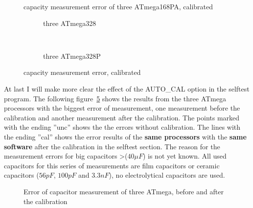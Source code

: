 \begin{figure}[H]
\centering

\caption{capacity measurement error of three ATmega168PA, calibrated}
\label{fig:mega168PAcal}
\end{figure}

\begin{figure}[H]
  \begin{subfigure}[b]{9cm}
    \centering
    \resizebox{9cm}{!}{}
    \caption{three ATmega328}
    \label{fig:mega328cal}
  \end{subfigure}
  ~
  \begin{subfigure}[b]{9cm}
    \centering
    \resizebox{9cm}{!}{}
    \caption{three ATmega328P}
    \label{fig:mega328Pcal}
  \end{subfigure}
  \caption{capacity measurement error, calibrated}
\end{figure}

At last I will make more clear the effect of the AUTO\_CAL option in the selftest program.
The following figure~\ref{fig:MegaAuto} shows the results from the three ATmega processors
with the biggest error of measurement, one measurement before the calibration and another
measurement after the calibration.
The points marked with the ending ''unc'' shows the the errors without calibration.
The lines with the ending ''cal'' shows the error results of the {\bf same processors} 
with the {\bf same software} after the calibration in the selftest section.
The reason for the measurement errors for big capacitors \textgreater(\(40 \mu F\)) is
not yet known. All used capacitors for this series of measurements are film capacitors or
ceramic capacitors (\(56 pF\), \(100 pF\) and \(3.3 nF\)), no electrolytical capacitors are used.

\begin{figure}[H]
\centering

\caption{Error of capacitor measurement of three ATmega, before and after the calibration}
\label{fig:MegaAuto}
\end{figure}

